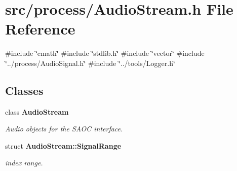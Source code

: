 \section{src/process/\+Audio\+Stream.h File Reference}
\label{_audio_stream_8h}
{\ttfamily \#include \char`\"{}cmath\char`\"{}}\newline
{\ttfamily \#include \char`\"{}stdlib.\+h\char`\"{}}\newline
{\ttfamily \#include \char`\"{}vector\char`\"{}}\newline
{\ttfamily \#include \char`\"{}../process/\+Audio\+Signal.\+h\char`\"{}}\newline
{\ttfamily \#include \char`\"{}../tools/\+Logger.\+h\char`\"{}}\newline
\subsection*{Classes}
\begin{DoxyCompactItemize}
\item 
class \textbf{ Audio\+Stream}
\begin{DoxyCompactList}\small\item\em Audio objects for the S\+A\+OC interface. \end{DoxyCompactList}\item 
struct \textbf{ Audio\+Stream\+::\+Signal\+Range}
\begin{DoxyCompactList}\small\item\em index range. \end{DoxyCompactList}\end{DoxyCompactItemize}
